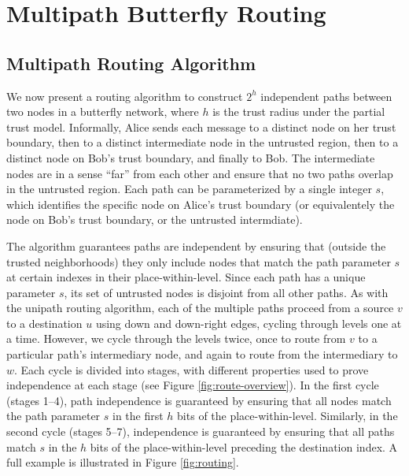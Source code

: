 \documentclass[sigconf]{acmart}
\begin{document}
\section{Multipath Butterfly Routing}
\label{sec-bf-route}

\subsection{Multipath Routing Algorithm}

We now present a routing algorithm to construct $2^h$ independent paths
between two nodes in a butterfly network,
where $h$ is the trust radius under the partial trust model.
Informally, Alice sends each message to a distinct node on her
trust boundary, then to a distinct intermediate node in the untrusted region,
then to a distinct node on Bob's trust boundary, and finally to Bob.
The intermediate nodes are in a sense ``far'' from each other and ensure that
no two paths overlap in the untrusted region.
Each path can be parameterized by a single integer $s$, which identifies
the specific node on Alice's trust boundary
(or equivalentely the node on Bob's trust boundary, or the untrusted intermdiate).

The algorithm guarantees paths are independent by ensuring that
(outside the trusted neighborhoods)
they only include
nodes that match the path parameter $s$ at certain indexes in their
place-within-level.
Since each path has a unique parameter $s$,
its set of untrusted nodes is disjoint from all other paths.
As with the unipath routing algorithm,
each of the multiple paths proceed from a source $v$ to a destination $u$
using down and down-right edges,
cycling through levels one at a time.
However, we cycle through the levels twice, once to route from $v$ to a
particular path's intermediary node,
and again to route from the intermediary to $w$.
Each cycle is divided into stages,
with different properties used to prove independence at each stage
(see Figure \ref{fig:route-overview}).
In the first cycle (stages 1--4), path independence is guaranteed by ensuring that
all nodes match the path parameter $s$ in the first $h$ bits of the place-within-level.
Similarly, in the second cycle (stages 5--7),
independence is guaranteed by ensuring that all paths match $s$ in the
$h$ bits of the place-within-level preceding the destination index.
A full example is illustrated in Figure \ref{fig:routing}.
\end{document}
